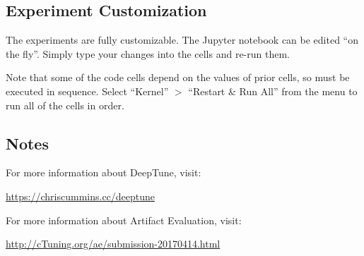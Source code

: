 \subsection{Experiment Customization}

The experiments are fully customizable. The Jupyter notebook can be edited ``on
the fly''. Simply type your changes into the cells and re-run them.

\noindent Note that some of the code cells depend on the values of prior cells,
so must be executed in sequence. Select ``Kernel'' $>$ ``Restart \& Run All''
from the menu to run all of the cells in order.


\subsection{Notes}
\noindent For more information about DeepTune, visit:

\url{https://chriscummins.cc/deeptune}

\noindent For more information about Artifact Evaluation, visit:

\url{http://cTuning.org/ae/submission-20170414.html}

\raggedend
